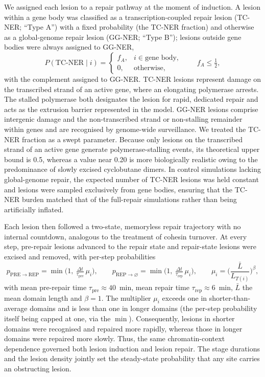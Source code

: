 \documentclass[11pt]{article}
\begin{document}
\medskip
We assigned each lesion to a repair pathway at the moment of induction. A lesion
within a gene body was classified as a transcription-coupled repair lesion (TC-NER;
``Type A'') with a fixed probability (the TC-NER fraction) and otherwise as a
global-genome repair lesion (GG-NER; ``Type B''); lesions outside gene bodies were
always assigned to GG-NER,
%
\begin{equation}
P(\text{TC-NER}\mid i) =
\begin{cases}
f_A, & i \in \text{gene body},\\[2pt]
0, & \text{otherwise},
\end{cases}
\qquad f_A \le \tfrac{1}{2},
\end{equation}
%
with the complement assigned to GG-NER. TC-NER lesions represent damage on the
transcribed strand of an active gene, where an elongating polymerase arrests. The
stalled polymerase both designates the lesion for rapid, dedicated repair and acts as
the extrusion barrier represented in the model. GG-NER lesions comprise intergenic
damage and the non-transcribed strand or non-stalling remainder within genes and are
recognised by genome-wide surveillance. We treated the TC-NER fraction as a swept
parameter. Because only lesions on the transcribed strand of an active gene generate
polymerase-stalling events, its theoretical upper bound is 0.5, whereas a value near
0.20 is more biologically realistic owing to the predominance of slowly excised
cyclobutane dimers. In control simulations lacking global-genome repair, the expected
number of TC-NER lesions was held constant and lesions were sampled exclusively from
gene bodies, ensuring that the TC-NER burden matched that of the full-repair
simulations rather than being artificially inflated.

Each lesion then followed a two-state, memoryless repair trajectory with no internal
countdown, analogous to the treatment of cohesin turnover. At every step, pre-repair
lesions advanced to the repair state and repair-state lesions were excised and removed,
with per-step probabilities
%
\begin{equation}
p_{\mathrm{PRE}\to\mathrm{REP}}
= \min\!\Big(1,\ \tfrac{\Delta t}{\tau_{\mathrm{pre}}}\,\mu_i\Big),
\qquad
p_{\mathrm{REP}\to\varnothing}
= \min\!\Big(1,\ \tfrac{\Delta t}{\tau_{\mathrm{rep}}}\,\mu_i\Big),
\qquad
\mu_i = \Big(\frac{\bar L}{L_{T(i)}}\Big)^{\beta},
\end{equation}
%
with mean pre-repair time $\tau_{\mathrm{pre}}\approx40$~min, mean repair time
$\tau_{\mathrm{rep}}\approx6$~min, $\bar L$ the mean domain length and $\beta=1$. The
multiplier $\mu_i$ exceeds one in shorter-than-average domains and is less than one in
longer domains (the per-step probability itself being capped at one, via the $\min$).
Consequently, lesions in shorter domains were recognised and repaired more rapidly,
whereas those in longer domains were repaired more slowly. Thus, the same
chromatin-context dependence governed both lesion induction and lesion repair. The
stage durations and the lesion density jointly set the steady-state probability that
any site carries an obstructing lesion.
\end{document}
